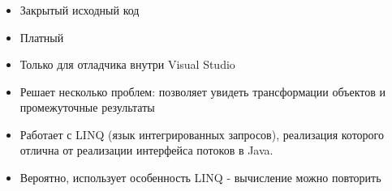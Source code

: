 \begin{frame}
\frametitle{\insertsection} 
\framesubtitle{\insertsubsection}
\begin{itemize}
	\item Закрытый исходный код
	\item Платный
	\item Только для отладчика внутри Visual Studio
	\item Решает несколько проблем: позволяет увидеть трансформации объектов и промежуточные результаты
	\item Работает с LINQ (язык интегрированных запросов), реализация которого отлична от реализации интерфейса потоков в Java. 
	\item Вероятно, использует особенность LINQ - вычисление можно повторить
	
	\inputminted{csharp}{code/repeat.cs}
\end{itemize}
\end{frame}
